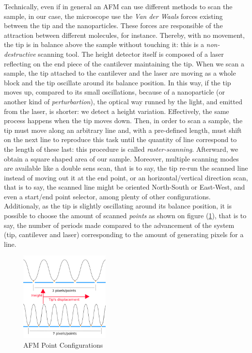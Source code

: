 \documentclass{article}
\numberwithin{equation}{section}
\begin{document}
Technically, even if in general an AFM can use different methods to scan the sample, in our case, the microscope use the \textit{Van der Waals} forces existing between the tip and the nanoparticles. These forces are responsible of the attraction between different molecules, for instance. Thereby, with no movement, the tip is in balance above the sample without touching it: this is a \textit{non-destructive} scanning tool. The height detector itself is composed of a laser reflecting on the end piece of the cantilever maintaining the tip. When we scan a sample, the tip attached to the cantilever and the laser are moving as a whole block and the tip oscillate around its balance position. In this way, if the tip moves up, compared to its small oscillations, because of a nanoparticle (or another kind of \textit{perturbartion}), the optical way runned by the light, and emitted from the laser, is shorter: we detect a height variation. Effectively, the same process happens when the tip moves down. Then, in order to scan a sample, the tip must move along an arbitrary line and, with a pre-defined length, must shift on the next line to reproduce this task until the quantity of line correspond to the length of these last: this procedure is called \textit{raster-scanning}. Afterward, we obtain a square shaped area of our sample. Moreover, multiple scanning modes are available like a double sens scan, that is to say, the tip re-run the scanned line instead of moving out it at the end point, or an horizontal/vertical direction scan, that is to say, the scanned line might be oriented North-South or East-West, and even a start/end point selector, among plenty of other configurations.
Additionaly, as the tip is slightly oscillating around its balance position, it is possible to choose the amount of scanned \textit{points} as shown on figure (\ref{fig:afm_scan_point_config}), that is to say, the number of periods made compared to the advancement of the system (tip, cantilever and laser) corresponding to the amount of generating pixels for a line. 
\begin{figure}[h!]
    \centering
    \includegraphics[width=0.4\textwidth, height=0.40\textwidth]{afm_scan_point_config.png}
    \caption{AFM Point Configurations}
    \label{fig:afm_scan_point_config}
\end{figure}
\end{document}
